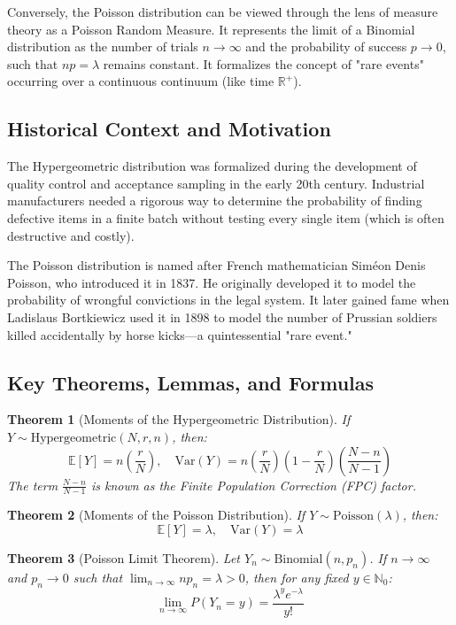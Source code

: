 \documentclass[11pt]{article}
\newtheorem{theorem}{Theorem}[section]
\theoremstyle{definition}
\theoremstyle{remark}
\begin{document}
Conversely, the Poisson distribution can be viewed through the lens of measure theory as a Poisson Random Measure. It represents the limit of a Binomial distribution as the number of trials $n \to \infty$ and the probability of success $p \to 0$, such that $np = \lambda$ remains constant. It formalizes the concept of "rare events" occurring over a continuous continuum (like time $\mathbb{R}^+$).

\subsection{Historical Context and Motivation}
The Hypergeometric distribution was formalized during the development of quality control and acceptance sampling in the early 20th century. Industrial manufacturers needed a rigorous way to determine the probability of finding defective items in a finite batch without testing every single item (which is often destructive and costly). 

The Poisson distribution is named after French mathematician Sim\'{e}on Denis Poisson, who introduced it in 1837. He originally developed it to model the probability of wrongful convictions in the legal system. It later gained fame when Ladislaus Bortkiewicz used it in 1898 to model the number of Prussian soldiers killed accidentally by horse kicks—a quintessential "rare event."

\subsection{Key Theorems, Lemmas, and Formulas}
\begin{theorem}[Moments of the Hypergeometric Distribution]
If $Y \sim \text{Hypergeometric}(N, r, n)$, then:
\[ \mathbb{E}[Y] = n\left(\frac{r}{N}\right), \quad \text{Var}(Y) = n\left(\frac{r}{N}\right)\left(1 - \frac{r}{N}\right)\left(\frac{N-n}{N-1}\right) \]
The term $\frac{N-n}{N-1}$ is known as the Finite Population Correction (FPC) factor.
\end{theorem}

\begin{theorem}[Moments of the Poisson Distribution]
If $Y \sim \text{Poisson}(\lambda)$, then:
\[ \mathbb{E}[Y] = \lambda, \quad \text{Var}(Y) = \lambda \]
\end{theorem}

\begin{theorem}[Poisson Limit Theorem]
Let $Y_n \sim \text{Binomial}(n, p_n)$. If $n \to \infty$ and $p_n \to 0$ such that $\lim_{n \to \infty} np_n = \lambda > 0$, then for any fixed $y \in \mathbb{N}_0$:
\[ \lim_{n \to \infty} P(Y_n = y) = \frac{\lambda^y e^{-\lambda}}{y!} \]
\end{theorem}
\end{document}
